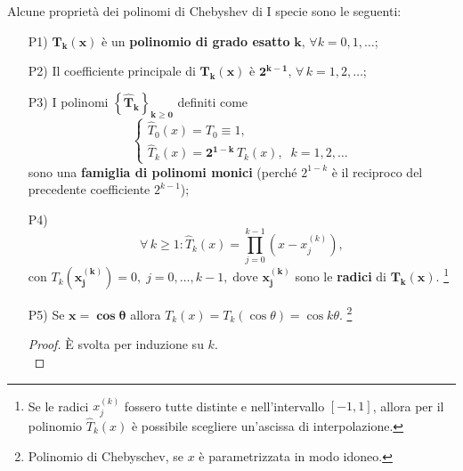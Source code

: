 \begin{property}
	Alcune proprietà dei polinomi di Chebyshev di I specie sono le seguenti:
	\begin{itemize}
		\item [P1)] $\boldsymbol{T_k(x)}$ è un \textbf{polinomio di grado esatto} $\boldsymbol k,\,\forall k=0,1,\hdots$;
		\item[P2)]\footnotemark Il coefficiente principale di $\boldsymbol{T_k(x)}$ è $\boldsymbol{2^{k-1}},\,\forall\,k=1,2,\hdots$;
		\item[P3)]\footnotemark I polinomi $\boldsymbol{\left\{\widehat T_k\right\}_{k\geq 0}}$ definiti come
		\begin{equation}\label{eq:polinomio_monico}
			\begin{cases}
				\widehat T_0(x)=T_0\equiv 1,\\
				\widehat T_k(x) =\boldsymbol{2^{1-k}}\, T_k(x),\;\; k=1,2,\hdots
			\end{cases}
		\end{equation}
		sono una \textbf{famiglia di polinomi monici} (perché $2^{1-k}$ è il reciproco del precedente coefficiente $2^{k-1}$);
		\item[P4)] 
		\begin{equation*}
			\forall\, k\geq 1: \widehat T_k(x)=\prod_{j=0}^{k-1}\left(x-x_j^{(k)}\right),
		\end{equation*}
		con $T_k\left(\boldsymbol{x_j^{(k)}}\right)=0,\; j=0,\hdots,k-1,\;\text{dove } \boldsymbol{x_j^{(k)}}$ sono le \textbf{radici} di $\boldsymbol{T_k(x)}$. \footnote{Se le radici $x_j^{(k)}$ fossero tutte distinte e nell'intervallo $[-1,1]$, allora per il polinomio $\widehat T_k(x)$ è possibile scegliere un'ascissa di interpolazione.}
		 \item[P5)] Se $\boldsymbol{x=\cos\theta}$ allora $T_k(x)=T_k(\cos\theta)=\cos{k\theta}$. \footnote{Polinomio di Chebyschev, se $x$ è parametrizzata in modo idoneo.}
		\begin{proof}
			È svolta per induzione su $k$.
			\begin{equation*}

\end{equation*}
\end{proof}
\end{itemize}
\end{property}
